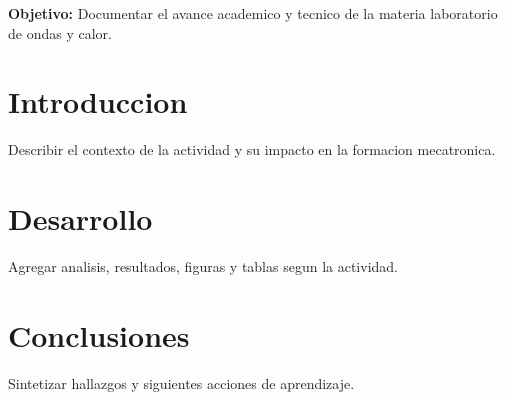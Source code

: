 \documentclass[spanish,letterpaper,oneside]{article}
\begin{document}
\templatePortrait
\templatePagecfg
\onehalfspacing

\begin{abstractd}
\textbf{Objetivo:} Documentar el avance academico y tecnico de la materia laboratorio de ondas y calor.
\end{abstractd}

\templateIndex
\templateFinalcfg

\section{Introduccion}
Describir el contexto de la actividad y su impacto en la formacion mecatronica.

\section{Desarrollo}
Agregar analisis, resultados, figuras y tablas segun la actividad.

\section{Conclusiones}
Sintetizar hallazgos y siguientes acciones de aprendizaje.



\end{document}
